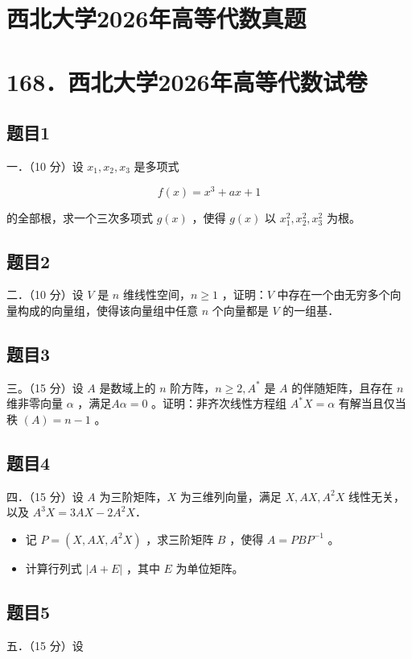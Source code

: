 \documentclass{article}
\begin{document}
\section*{西北大学2026年高等代数真题}
\section*{168．西北大学2026年高等代数试卷}

\subsection{题目1}
一．（10 分）设 \(x_{1}, x_{2}, x_{3}\) 是多项式

\[
f(x)=x^{3}+a x+1
\]

的全部根，求一个三次多项式 \(g(x)\) ，使得 \(g(x)\) 以 \(x_{1}^{2}, x_{2}^{2}, x_{3}^{2}\) 为根。

\subsection{题目2}
二．（10 分）设 \(V\) 是 \(n\) 维线性空间，\(n \geq 1\) ，证明：\(V\) 中存在一个由无穷多个向量构成的向量组，使得该向量组中任意 \(n\) 个向量都是 \(V\) 的一组基．

\subsection{题目3}
三。（15 分）设 \(A\) 是数域上的 \(n\) 阶方阵，\(n \geq 2, A^{*}\) 是 \(A\) 的伴随矩阵，且存在 \(n\) 维非零向量 \(\alpha\) ，满足\(A \alpha=0\) 。证明：非齐次线性方程组 \(A^{*} X=\alpha\) 有解当且仅当秩 \((A)=n-1\) 。

\subsection{题目4}
四．（15 分）设 \(A\) 为三阶矩阵，\(X\) 为三维列向量，满足 \(X, A X, A^{2} X\) 线性无关，以及 \(A^{3} X=3 A X-2 A^{2} X\)．

\begin{itemize}
  \item[（1）] 记 \(P=\left(X, A X, A^{2} X\right)\) ，求三阶矩阵 \(B\) ，使得 \(A=P B P^{-1}\) 。
  \item[（2）] 计算行列式 \(|A+E|\) ，其中 \(E\) 为单位矩阵。
\end{itemize}

\subsection{题目5}
五．（15 分）设
\end{document}
